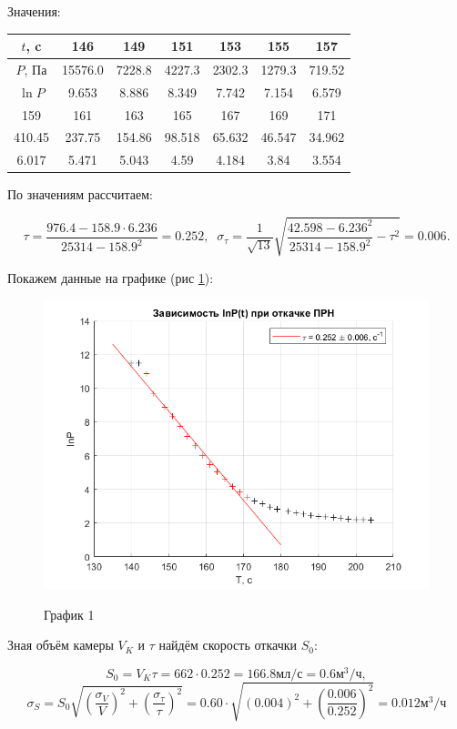 \documentclass[a4paper,12pt]{article} %
\begin{document}
\begin{enumerate}
Значения:
\begin{center}
\begin{tabular}{|c|c|c|c|c|c|c|}
\hline 
$t$, c & 146 & 149 & 151 & 153 & 155 & 157 \\
\hline
$P$, Па & 15576.0 & 7228.8 & 4227.3 & 2302.3 & 1279.3 & 719.52\\
\hline
$\ln{P}$ & 9.653 & 8.886 & 8.349 & 7.742 & 7.154 & 6.579\\
\hline 
\hline 
159 & 161 & 163 & 165 & 167 & 169 & 171\\
\hline
410.45 & 237.75 & 154.86 & 98.518 & 65.632 & 46.547 & 34.962\\
\hline
6.017 & 5.471 & 5.043 & 4.59 & 4.184 & 3.84 & 3.554\\
\hline
\end{tabular} 
\end{center}

По значениям рассчитаем:

\[
\tau = \frac{ 976.4  -  158.9 \cdot  6.236 }{ 25314  -  158.9 ^ 2} = 0.252, \;\;
\sigma_\tau = \frac{1}{\sqrt{13}}\sqrt{\frac{42.598 - 6.236 ^ 2}{ 25314  -  158.9 ^ 2} - \tau^2} = 0.006.
\]

Покажем данные на графике (рис \ref{fig1}):

\begin{figure}
\centering
\includegraphics[width=1\linewidth]{plot1.png}
\label{fig1}
\caption{График 1}
\end{figure}

Зная объём камеры $V_K$ и $\tau$ найдём скорость откачки $S_0$:

\[
S_0 = V_K \tau = 662 \cdot 0.252 = 166.8 \text{мл/с} = 0.6 \text{м}^3/\text{ч}, 
\]
\[
\sigma_S = S_0 \sqrt{\left( \frac{\sigma_V}{V} \right)^2 + \left( \frac{\sigma_\tau}{\tau} \right)^2} = 0.60 \cdot \sqrt{\left( 0.004 \right)^2 + \left( \frac{0.006}{0.252} \right)^2} = 0.012 \text{м}^3/\text{ч}
\]


\end{enumerate}
\end{document}
